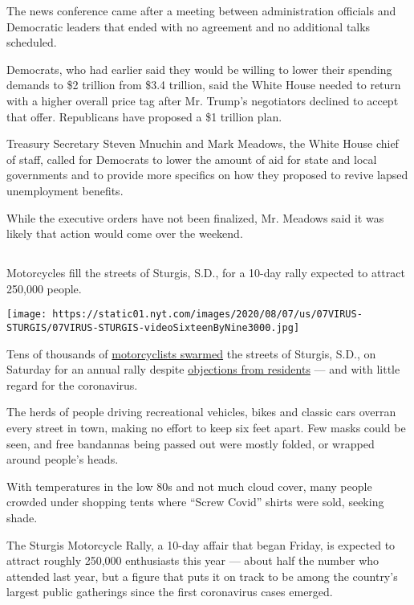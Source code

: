 The news conference came after a meeting between administration
officials and Democratic leaders that ended with no agreement and no
additional talks scheduled.

Democrats, who had earlier said they would be willing to lower their
spending demands to \$2 trillion from \$3.4 trillion, said the White
House needed to return with a higher overall price tag after Mr. Trump's
negotiators declined to accept that offer. Republicans have proposed a
\$1 trillion plan.

Treasury Secretary Steven Mnuchin and Mark Meadows, the White House
chief of staff, called for Democrats to lower the amount of aid for
state and local governments and to provide more specifics on how they
proposed to revive lapsed unemployment benefits.

While the executive orders have not been finalized, Mr. Meadows said it
was likely that action would come over the weekend.

\hypertarget{section-2}{%
\subsection{}\label{section-2}}

Motorcycles fill the streets of Sturgis, S.D., for a 10-day rally
expected to attract 250,000 people.

\texttt{[image: https://static01.nyt.com/images/2020/08/07/us/07VIRUS-STURGIS/07VIRUS-STURGIS-videoSixteenByNine3000.jpg]}

Tens of thousands of
\href{https://www.nytimes.com/2020/08/07/us/sturgis-motorcyle-rally.html}{motorcyclists
swarmed} the streets of Sturgis, S.D., on Saturday for an annual rally
despite
\href{https://www.nytimes.com/2020/08/06/us/sturgis-motorcyle-rally-coronavirus.html}{objections
from residents} --- and with little regard for the coronavirus.

The herds of people driving recreational vehicles, bikes and classic
cars overran every street in town, making no effort to keep six feet
apart. Few masks could be seen, and free bandannas being passed out were
mostly folded, or wrapped around people's heads.

With temperatures in the low 80s and not much cloud cover, many people
crowded under shopping tents where ``Screw Covid'' shirts were sold,
seeking shade.

The Sturgis Motorcycle Rally, a 10-day affair that began Friday, is
expected to attract roughly 250,000 enthusiasts this year --- about half
the number who attended last year, but a figure that puts it on track to
be among the country's largest public gatherings since the first
coronavirus cases emerged.

